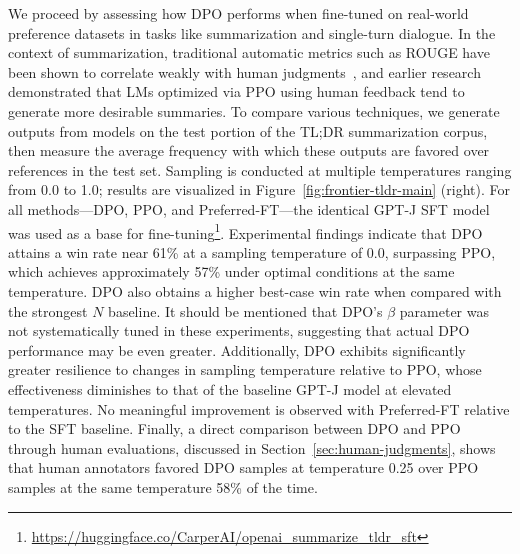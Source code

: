 We proceed by assessing how DPO performs when fine-tuned on real-world preference datasets in tasks like summarization and single-turn dialogue. In the context of summarization, traditional automatic metrics such as ROUGE have been shown to correlate weakly with human judgments~\citep{stiennon2022learning}, and earlier research demonstrated that LMs optimized via PPO using human feedback tend to generate more desirable summaries. To compare various techniques, we generate outputs from models on the test portion of the TL;DR summarization corpus, then measure the average frequency with which these outputs are favored over references in the test set. Sampling is conducted at multiple temperatures ranging from 0.0 to 1.0; results are visualized in Figure~\ref{fig:frontier-tldr-main} (right). For all methods—DPO, PPO, and Preferred-FT—the identical GPT-J SFT model was used as a base for fine-tuning\footnote{\url{https://huggingface.co/CarperAI/openai_summarize_tldr_sft}}. Experimental findings indicate that DPO attains a win rate near 61\% at a sampling temperature of 0.0, surpassing PPO, which achieves approximately 57\% under optimal conditions at the same temperature. DPO also obtains a higher best-case win rate when compared with the strongest $N$ baseline. It should be mentioned that DPO's $\beta$ parameter was not systematically tuned in these experiments, suggesting that actual DPO performance may be even greater. Additionally, DPO exhibits significantly greater resilience to changes in sampling temperature relative to PPO, whose effectiveness diminishes to that of the baseline GPT-J model at elevated temperatures. No meaningful improvement is observed with Preferred-FT relative to the SFT baseline. Finally, a direct comparison between DPO and PPO through human evaluations, discussed in Section~\ref{sec:human-judgments}, shows that human annotators favored DPO samples at temperature 0.25 over PPO samples at the same temperature 58\% of the time.

